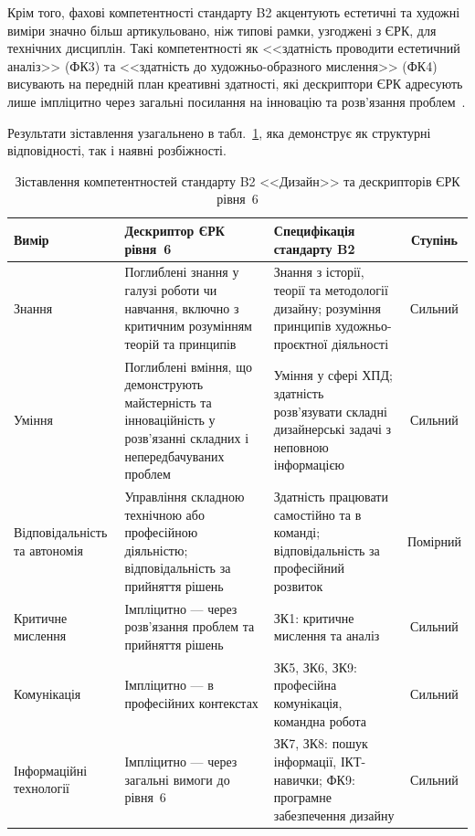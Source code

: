Крім того, фахові компетентності стандарту B2 акцентують естетичні та художні виміри значно більш артикульовано, ніж типові рамки, узгоджені з ЄРК, для технічних дисциплін. Такі компетентності як <<здатність проводити естетичний аналіз>> (ФК3) та <<здатність до художньо-образного мислення>> (ФК4) висувають на передній план креативні здатності, які дескриптори ЄРК адресують лише імпліцитно через загальні посилання на інновацію та розв'язання проблем~\cite{Musiienko2025DesignEducation}.

Результати зіставлення узагальнено в табл.~\ref{tab:b2-eqf-alignment}, яка демонструє як структурні відповідності, так і наявні розбіжності.

\begin{table}[htbp]
\caption{Зіставлення компетентностей стандарту B2 <<Дизайн>> та дескрипторів ЄРК рівня~6}
\label{tab:b2-eqf-alignment}
\centering\small
\begin{tabularx}{\textwidth}{@{}p{2.5cm}XXc@{}}
\toprule
\textbf{Вимір} & \textbf{Дескриптор ЄРК рівня~6} & \textbf{Специфікація стандарту B2} & \textbf{Ступінь} \\
\midrule
Знання & Поглиблені знання у галузі роботи чи навчання, включно з критичним розумінням теорій та принципів & Знання з історії, теорії та методології дизайну; розуміння принципів художньо-проєктної діяльності & Сильний \\
\addlinespace
Уміння & Поглиблені вміння, що демонструють майстерність та інноваційність у розв'язанні складних і непередбачуваних проблем & Уміння у сфері ХПД; здатність розв'язувати складні дизайнерські задачі з неповною інформацією & Сильний \\
\addlinespace
Відповідальність та автономія & Управління складною технічною або професійною діяльністю; відповідальність за прийняття рішень & Здатність працювати самостійно та в команді; відповідальність за професійний розвиток & Помірний \\
\addlinespace
Критичне мислення & Імпліцитно --- через розв'язання проблем та прийняття рішень & ЗК1: критичне мислення та аналіз & Сильний \\
\addlinespace
Комунікація & Імпліцитно --- в професійних контекстах & ЗК5, ЗК6, ЗК9: професійна комунікація, командна робота & Сильний \\
\addlinespace
Інформаційні технології & Імпліцитно --- через загальні вимоги до рівня~6 & ЗК7, ЗК8: пошук інформації, ІКТ-навички; ФК9: програмне забезпечення дизайну & Сильний \\
\bottomrule
\end{tabularx}
\end{table}

